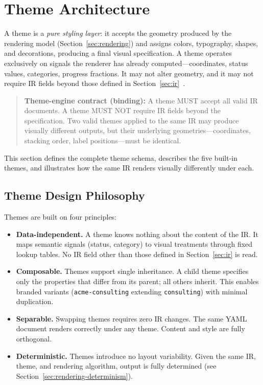 \section{Theme Architecture}
\label{sec:themes}

A theme is a \emph{pure styling layer}: it accepts the geometry produced by the rendering
model (Section~\ref{sec:rendering}) and assigns colors, typography, shapes, and decorations,
producing a final visual specification. A theme operates exclusively on signals the renderer
has already computed---coordinates, status values, categories, progress fractions. It may not
alter geometry, and it may not require IR fields beyond those defined in
Section~\ref{sec:ir}~\cite{thinkcell,vegalite2017}.

\begin{quote}
\textbf{Theme-engine contract (binding):} A theme MUST accept all valid IR documents. A theme
MUST NOT require IR fields beyond the specification. Two valid themes applied to the same IR
may produce visually different outputs, but their underlying geometries---coordinates, stacking
order, label positions---must be identical.
\end{quote}

This section defines the complete theme schema, describes the five built-in themes, and
illustrates how the same IR renders visually differently under each.

\subsection{Theme Design Philosophy}
\label{sec:themes-philosophy}

Themes are built on four principles:

\begin{itemize}
  \item \textbf{Data-independent.} A theme knows nothing about the content of the IR. It maps
        semantic signals (status, category) to visual treatments through fixed lookup tables.
        No IR field other than those defined in Section~\ref{sec:ir} is read.
  \item \textbf{Composable.} Themes support single inheritance. A child theme specifies only
        the properties that differ from its parent; all others inherit. This enables branded
        variants (\texttt{acme-consulting} extending \texttt{consulting}) with minimal
        duplication.
  \item \textbf{Separable.} Swapping themes requires zero IR changes. The same YAML document
        renders correctly under any theme. Content and style are fully orthogonal.
  \item \textbf{Deterministic.} Themes introduce no layout variability. Given the same IR,
        theme, and rendering algorithm, output is fully determined (see
        Section~\ref{sec:rendering-determinism}).
\end{itemize}


